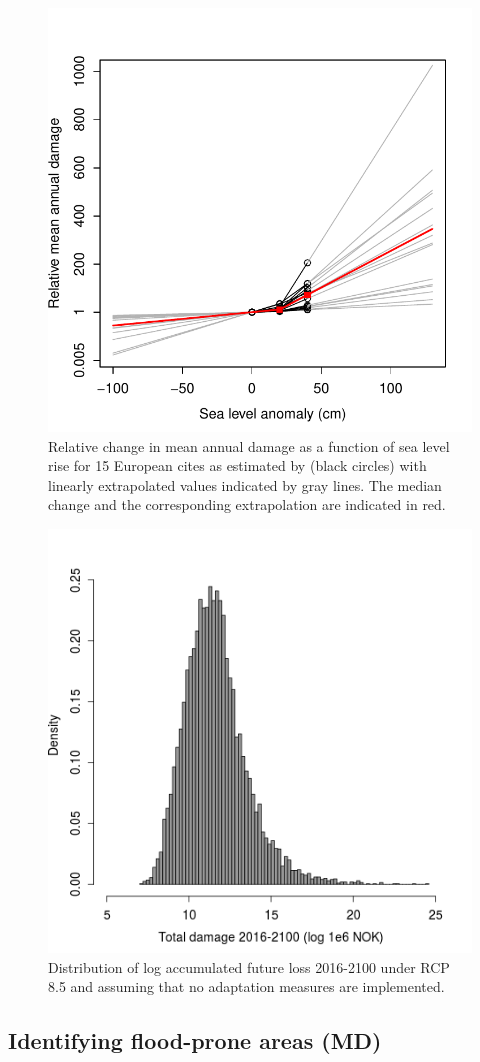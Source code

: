 \documentclass[draft,linenumbers]{agujournal}
\begin{document}
\begin{figure}[!hbpt]
\begin{center}
\includegraphics[width=0.5\linewidth]{EuropeanIncreaseLossExtrapolationUncertainty.pdf}
\caption{ Relative change in mean annual damage as a function of sea level rise for 15 European cites as estimated by \cite{Hallegatte&2013} (black circles) with linearly extrapolated values indicated by gray lines. The median change and the corresponding extrapolation are indicated in red.}
\label{fig:ChangeInDamage}
\end{center}
\end{figure}


\begin{figure}[!hbpt]
\begin{center}
\includegraphics[width=0.5\linewidth]{AccumulatedFutureLoss.png}
\caption{Distribution of log  accumulated future loss 2016-2100 under RCP 8.5 and assuming that no adaptation measures are implemented.} 
\label{fig:NoAction}
\end{center}
\end{figure}


\subsection{Identifying flood-prone areas {\color{blue} (MD)}}
\end{document}
